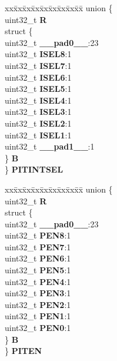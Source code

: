 \begin{DoxyCompactItemize}
\begin{tabbing}
\end{tabbing}\item 
\mbox{\label{structPIT__tag_a5438afcb126b4f5310ce7666c763516a}} 
\begin{tabbing}
xx\=xx\=xx\=xx\=xx\=xx\=xx\=xx\=xx\=\kill
union \{\\
\>uint32\_t {\bfseries R}\\
\>struct \{\\
\>\>uint32\_t {\bfseries \_\_pad0\_\_}:23\\
\>\>uint32\_t {\bfseries ISEL8}:1\\
\>\>uint32\_t {\bfseries ISEL7}:1\\
\>\>uint32\_t {\bfseries ISEL6}:1\\
\>\>uint32\_t {\bfseries ISEL5}:1\\
\>\>uint32\_t {\bfseries ISEL4}:1\\
\>\>uint32\_t {\bfseries ISEL3}:1\\
\>\>uint32\_t {\bfseries ISEL2}:1\\
\>\>uint32\_t {\bfseries ISEL1}:1\\
\>\>uint32\_t {\bfseries \_\_pad1\_\_}:1\\
\>\} {\bfseries B}\\
\} {\bfseries PITINTSEL}\\

\end{tabbing}\item 
\mbox{\label{structPIT__tag_a189ad4169b736e65420da83e89195fb9}} 
\begin{tabbing}
xx\=xx\=xx\=xx\=xx\=xx\=xx\=xx\=xx\=\kill
union \{\\
\>uint32\_t {\bfseries R}\\
\>struct \{\\
\>\>uint32\_t {\bfseries \_\_pad0\_\_}:23\\
\>\>uint32\_t {\bfseries PEN8}:1\\
\>\>uint32\_t {\bfseries PEN7}:1\\
\>\>uint32\_t {\bfseries PEN6}:1\\
\>\>uint32\_t {\bfseries PEN5}:1\\
\>\>uint32\_t {\bfseries PEN4}:1\\
\>\>uint32\_t {\bfseries PEN3}:1\\
\>\>uint32\_t {\bfseries PEN2}:1\\
\>\>uint32\_t {\bfseries PEN1}:1\\
\>\>uint32\_t {\bfseries PEN0}:1\\
\>\} {\bfseries B}\\
\} {\bfseries PITEN}\\


\end{tabbing}
\end{DoxyCompactItemize}
